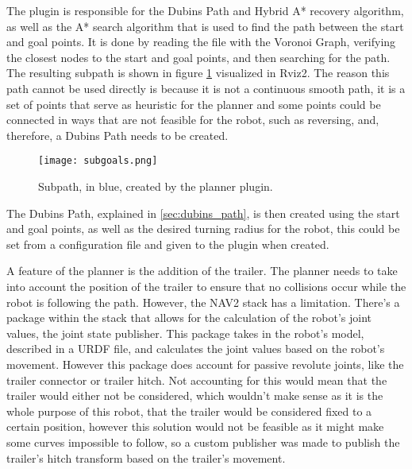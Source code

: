 The plugin is responsible for the Dubins Path and Hybrid A* recovery algorithm, 
as well as the A* search algorithm that is used to find the path between the start and goal points. It is done 
by reading the file with the Voronoi Graph, verifying the closest nodes to the 
start and goal points, and then searching for the path. The resulting subpath is 
shown in figure \ref{fig:subgoals} visualized in Rviz2.
The reason this path cannot be used directly is because it is not a continuous 
smooth path, it is a set of points that serve as heuristic for the planner and 
some points could be connected in ways that are not feasible for the robot, such as reversing, and, therefore, 
a Dubins Path needs to be created.
\begin{figure}[h]
    \centering
    \texttt{[image: subgoals.png]}
    \caption{Subpath, in blue, created by the planner plugin.}
    \label{fig:subgoals}
\end{figure}

The Dubins Path, explained in \ref{sec:dubins_path}, is then created using the start and goal points, as well as the desired 
turning radius for the robot, this could be set from a configuration file and 
given to the plugin when created.

A feature of the planner is the addition of the trailer. The planner needs to take into account 
the position of the trailer to ensure that no collisions occur while the robot is 
following the path. However, the \gls{NAV2} stack has a limitation. There's a package 
within the stack that allows for the calculation of the robot's joint values, the joint state 
publisher. This package takes in the robot's model, described in a \gls{URDF} file, and calculates the joint values 
based on the robot's movement. However this package does account for passive revolute joints, like 
the trailer connector or trailer hitch. Not accounting for this would mean 
that the trailer would either not be considered, which wouldn't make sense 
as it is the whole purpose of this robot, that the trailer would be considered 
fixed to a certain position, however this solution would not be feasible as it might make 
some curves impossible to follow, so a custom publisher was made to publish the trailer's hitch 
transform based on the trailer's movement. 